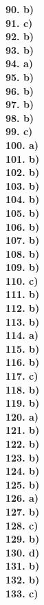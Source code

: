 \documentclass[8pt]{extarticle}
\begin{document}
\begin{multicols}{8}
\textbf{90. b)} \\
\textbf{91. c)} \\
\textbf{92. b)} \\
\textbf{93. b)} \\
\textbf{94. a)} \\
\textbf{95. b)} \\
\textbf{96. b)} \\
\textbf{97. b)} \\
\textbf{98. b)} \\
\textbf{99. c)} \\
\textbf{100. a)} \\
\textbf{101. b)} \\
\textbf{102. b)} \\
\textbf{103. b)} \\
\textbf{104. b)} \\
\textbf{105. b)} \\
\textbf{106. b)} \\
\textbf{107. b)} \\
\textbf{108. b)} \\
\textbf{109. b)} \\
\textbf{110. c)} \\
\textbf{111. b)} \\
\textbf{112. b)} \\
\textbf{113. b)} \\
\textbf{114. a)} \\
\textbf{115. b)} \\ 
\textbf{116. b)} \\
\textbf{117. c)} \\
\textbf{118. b)} \\
\textbf{119. b)} \\
\textbf{120. a)} \\
\textbf{121. b)} \\
\textbf{122. b)} \\
\textbf{123. b)} \\
\textbf{124. b)} \\
\textbf{125. b)} \\
\textbf{126. a)} \\
\textbf{127. b)} \\
\textbf{128. c)} \\
\textbf{129. b)} \\
\textbf{130. d)} \\
\textbf{131. b)} \\
\textbf{132. b)} \\
\textbf{133. c)} \\

\end{multicols}
\end{document}
